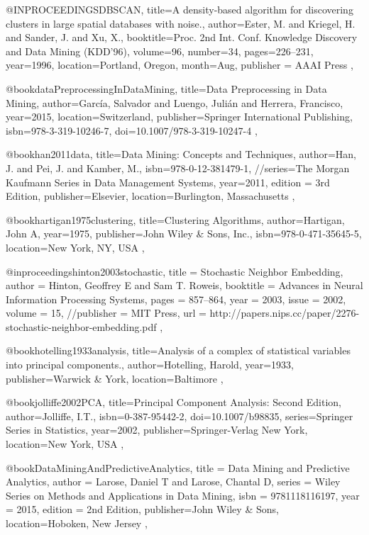 @INPROCEEDINGS{DBSCAN,
  title={A density-based algorithm for discovering clusters in large spatial databases with noise.},
  author={Ester, M. and Kriegel, H. and Sander, J. and Xu, X.},
  booktitle={Proc. 2nd Int. Conf. Knowledge Discovery and Data Mining (KDD’96)},
  volume={96},
  number={34},
  pages={226--231},
  year={1996},
  location={Portland, Oregon},
  month={Aug},
  publisher = {AAAI Press}
},


@book{dataPreprocessingInDataMining,
  title={Data Preprocessing in Data Mining},
  author={García, Salvador and Luengo, Julián and Herrera, Francisco},
  year={2015},
  location={Switzerland},
  publisher={Springer International Publishing},
  isbn={978-3-319-10246-7},
  doi={10.1007/978-3-319-10247-4}
},

@book{han2011data,
  title={Data Mining: Concepts and Techniques},
  author={Han, J. and Pei, J. and Kamber, M.},
  isbn={978-0-12-381479-1},
  //series={The Morgan Kaufmann Series in Data Management Systems},
  year={2011},
  edition = {3rd Edition},
  publisher={Elsevier},
  location={Burlington, Massachusetts}
},

@book{hartigan1975clustering,
  title={Clustering Algorithms},
  author={Hartigan, John A},
  year={1975},
  publisher={John Wiley \& Sons, Inc.},
  isbn={978-0-471-35645-5},
  location={New York, NY, USA}
},

@inproceedings{hinton2003stochastic,
  title = {Stochastic Neighbor Embedding},
  author = {Hinton, Geoffrey E and Sam T. Roweis},
  booktitle = {Advances in Neural Information Processing Systems},
  pages = {857--864},
  year = {2003},
  issue = {2002},
  volume = {15},
  //publisher = {MIT Press},
  url = {http://papers.nips.cc/paper/2276-stochastic-neighbor-embedding.pdf}
},

@book{hotelling1933analysis,
  title={Analysis of a complex of statistical variables into principal components.},
  author={Hotelling, Harold},
  year={1933},
  publisher={Warwick \& York},
  location={Baltimore}
},


@book{jolliffe2002PCA,
  title={Principal Component Analysis: Second Edition},
  author={Jolliffe, I.T.},
  isbn={0-387-95442-2},
  doi={10.1007/b98835},
  series={Springer Series in Statistics},
  year={2002},
  publisher={Springer-Verlag New York},
  location={New York, USA}
},

@book{DataMiningAndPredictiveAnalytics,
  title = {Data Mining and Predictive Analytics},
  author = {Larose, Daniel T and Larose, Chantal D},
  series = {Wiley Series on Methods and Applications in Data Mining},
  isbn = {9781118116197},
  year = {2015},
  edition = {2nd Edition},
  publisher={John Wiley \& Sons},
  location={Hoboken, New Jersey}
},

